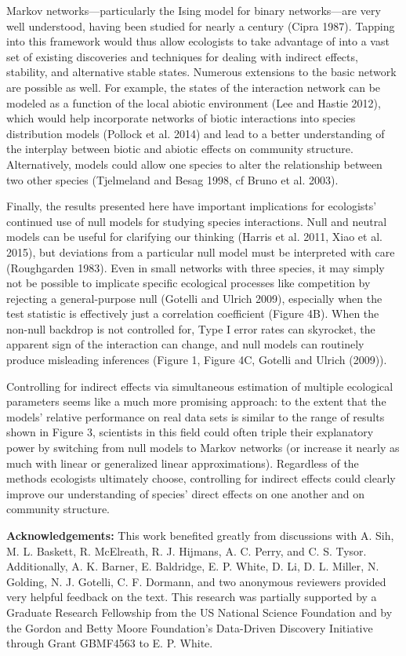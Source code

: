 \documentclass[12pt,]{article}
\begin{document}
\begin{spacing}{1.9}
\begin{flushleft}
Markov networks---particularly the Ising model for binary networks---are
very well understood, having been studied for nearly a century (Cipra
1987). Tapping into this framework would thus allow ecologists to take
advantage of into a vast set of existing discoveries and techniques for
dealing with indirect effects, stability, and alternative stable states.
Numerous extensions to the basic network are possible as well. For
example, the states of the interaction network can be modeled as a
function of the local abiotic environment (Lee and Hastie 2012), which
would help incorporate networks of biotic interactions into species
distribution models (Pollock et al. 2014) and lead to a better
understanding of the interplay between biotic and abiotic effects on
community structure. Alternatively, models could allow one species to
alter the relationship between two other species (Tjelmeland and Besag
1998, cf Bruno et al. 2003).

Finally, the results presented here have important implications for
ecologists' continued use of null models for studying species
interactions. Null and neutral models can be useful for clarifying our
thinking (Harris et al. 2011, Xiao et al. 2015), but deviations from a
particular null model must be interpreted with care (Roughgarden 1983).
Even in small networks with three species, it may simply not be possible
to implicate specific ecological processes like competition by rejecting
a general-purpose null (Gotelli and Ulrich 2009), especially when the
test statistic is effectively just a correlation coefficient (Figure
4B). When the non-null backdrop is not controlled for, Type I error
rates can skyrocket, the apparent sign of the interaction can change,
and null models can routinely produce misleading inferences (Figure 1,
Figure 4C, Gotelli and Ulrich (2009)).

Controlling for indirect effects via simultaneous estimation of multiple
ecological parameters seems like a much more promising approach: to the
extent that the models' relative performance on real data sets is
similar to the range of results shown in Figure 3, scientists in this
field could often triple their explanatory power by switching from null
models to Markov networks (or increase it nearly as much with linear or
generalized linear approximations). Regardless of the methods ecologists
ultimately choose, controlling for indirect effects could clearly
improve our understanding of species' direct effects on one another and
on community structure.

\noindent \textbf{Acknowledgements:} This work benefited greatly from
discussions with A. Sih, M. L. Baskett, R. McElreath, R. J. Hijmans, A.
C. Perry, and C. S. Tysor. Additionally, A. K. Barner, E. Baldridge, E.
P. White, D. Li, D. L. Miller, N. Golding, N. J. Gotelli, C. F. Dormann,
and two anonymous reviewers provided very helpful feedback on the text.
This research was partially supported by a Graduate Research Fellowship
from the US National Science Foundation and by the Gordon and Betty
Moore Foundation's Data-Driven Discovery Initiative through Grant
GBMF4563 to E. P. White.


\end{flushleft}
\end{spacing}
\end{document}
